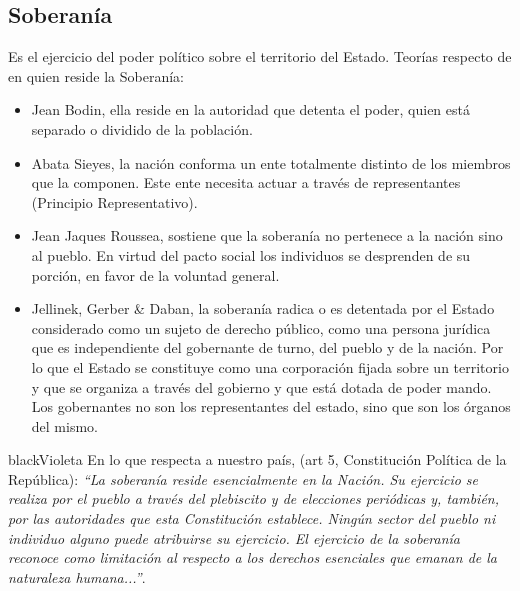 \documentclass{templateApunte}
\begin{document}
\subsection{Soberanía}
Es el ejercicio del poder político sobre el territorio del Estado.
\newline
Teorías respecto de en quien reside la Soberanía:
\begin{itemize}
  \item Jean Bodin, ella reside en la autoridad que detenta el poder, quien est\'a separado o dividido de la población.
  \item Abata Sieyes, la nación conforma un ente totalmente distinto de los miembros que la componen. Este ente necesita actuar a través de representantes (Principio Representativo). 
  \item Jean Jaques Roussea, sostiene que la soberanía no pertenece a la nación sino al pueblo. En virtud del pacto social los individuos se desprenden de su porción, en favor de la voluntad general.
  \item Jellinek, Gerber \& Daban, la soberanía radica o es detentada por el Estado considerado como un sujeto de derecho público, como una persona jurídica que es independiente del gobernante de turno, del pueblo y de la nación.
  \newline
  Por lo que el Estado se constituye como una corporación fijada sobre un territorio y que se organiza a través del gobierno y que est\'a dotada de poder mando. Los gobernantes no son los representantes del estado, sino que son los órganos del mismo.
\end{itemize}
\begin{cPB}{black}{Violeta}
  En lo que respecta a nuestro país, (art 5, Constitución Política de la República): \textit{``La soberanía reside esencialmente en la Nación. Su ejercicio se realiza por el pueblo a través del plebiscito y de elecciones periódicas y, también, por las autoridades que esta Constitución establece. Ningún sector del pueblo ni individuo alguno puede atribuirse su ejercicio. \newline El ejercicio de la soberanía reconoce como limitación al respecto a los derechos esenciales que emanan de la naturaleza humana...''}.
\end{cPB}
\end{document}
